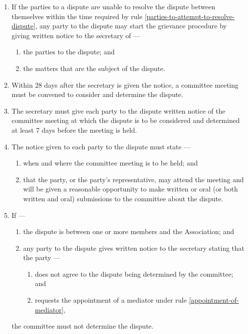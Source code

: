 \documentclass[../constitution.tex]{subfiles}
\begin{document}
\begin{enumerate}

\item If the parties to a dispute are unable to resolve the dispute between themselves within the time required by rule \ref{parties-to-attempt-to-resolve-dispute}, any party to the dispute may start the grievance procedure by giving written notice to the secretary of ---

  \begin{enumerate}
  
  \item the parties to the dispute; and
  \item the matters that are the subject of the dispute.
  \end{enumerate}
\item Within 28 days after the secretary is given the notice, a committee meeting must be convened to consider and determine the dispute.
\item The secretary must give each party to the dispute written notice of the committee meeting at which the dispute is to be considered and determined at least 7 days before the meeting is held.
\item The notice given to each party to the dispute must state ---

  \begin{enumerate}
  
  \item when and where the committee meeting is to be held; and
  \item that the party, or the party's representative, may attend the meeting and will be given a reasonable opportunity to make written or oral (or both written and oral) submissions to the committee about the dispute.
  \end{enumerate}
\item If ---

  \begin{enumerate}
  
  \item the dispute is between one or more members and the Association; and
  \item any party to the dispute gives written notice to the secretary stating that the party ---

    \begin{enumerate}
    
    \item does not agree to the dispute being determined by the committee; and
    \item requests the appointment of a mediator under rule \ref{appointment-of-mediator}, \label{grievance-appoint-mediator}
    \end{enumerate}
  \end{enumerate}
  the committee must not determine the dispute.
\end{enumerate}
\end{document}
